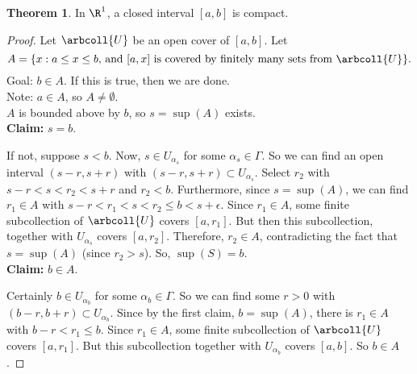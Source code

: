 \documentclass[a5paper]{article}
\theoremstyle{definition}%
\newtheorem{theorem}{Theorem}
\numberwithin{exercise}{section}
\theoremstyle{remark}%
\begin{document}
\begin{highlight}
\begin{theorem}
In $\R^1$, a closed interval $[a,b]$ is compact. 
\end{theorem}
\end{highlight}
\begin{proof}
Let $\arbcoll{U}$ be an open cover of $[a,b]$. Let 
$$A=\{x:a\leq x\leq b\text{, and }[a,x]\text{ is covered by finitely many sets from }\arbcoll{U}\}.$$
Goal: $b\in A$. If this is true, then we are done. \\
Note: $a\in A$, so $A\neq\emptyset$. \\
$A$ is bounded above by $b$, so $s=\sup(A)$ exists.\\
\textbf{Claim:} $s=b$. \\

If not, suppose $s<b$. Now, $s\in U_{\alpha_s}$ for some $\alpha_s\in\Gamma$. So we can find an open interval $(s-r, s+r)$ with $(s-r, s+r)\subset U_{\alpha_s}$. Select $r_2$ with $s-r<s<r_2<s+r$ and $r_2<b$. Furthermore, since $s=\sup(A)$, we can find $r_1\in A$ with $s-r<r_1<s<r_2\leq b<s+\epsilon$. Since $r_1\in A$, some finite subcollection of $\arbcoll{U}$ covers $[a,r_1]$. But then this subcollection, together with $U_{\alpha_s}$ covers $[a,r_2]$. Therefore, $r_2\in A$, contradicting the fact that $s=\sup(A)$ (since $r_2>s$). So, $\sup(S)=b$. \qedwhite
\mbox{}\\
\textbf{Claim:} $b\in A$. \\

Certainly $b\in U_{\alpha_b}$ for some $\alpha_b\in\Gamma$. So we can find some $r>0$ with $(b-r,b+r)\subset U_{\alpha_b}$. Since by the first claim, $b=\sup(A)$, there is $r_1\in A$ with $b-r<r_1\leq b$. Since $r_1\in A$, some finite subcollection of $\arbcoll{U}$ covers $[a,r_1]$. But this subcollection together with $U_{\alpha_b}$ covers $[a,b]$. So $b\in A$. 
\end{proof}
\end{document}
